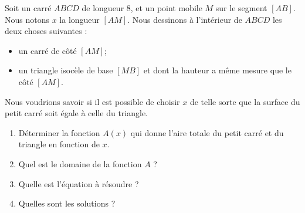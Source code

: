 
\begin{exercice}\label{exosmath-0078}
 
    Soit un carré \( ABCD\) de longueur \unit{8}{\centi\meter}, et un point mobile \( M\) sur le segment \( [AB]\). Nous notons \( x\) la longueur \( [AM]\). Nous dessinons à l'intérieur de \( ABCD\) les deux choses suivantes :
    \begin{itemize}
        \item un carré de côté \( [AM]\);
        \item
            un triangle isocèle de base \( [MB]\) et dont la hauteur a même mesure que le côté \( [AM]\).
    \end{itemize}
    Nous voudrions savoir si il est possible de choisir \( x\) de telle sorte que la surface du petit carré soit égale à celle du triangle.
    \begin{enumerate}
        \item
            Déterminer la fonction \( A(x)\) qui donne l'aire totale du petit carré et du triangle en fonction de \( x\).
        \item
            Quel est le domaine de la fonction \( A\) ?
        \item
            Quelle est l'équation à résoudre ?
        \item
            Quelles sont les solutions ?
    \end{enumerate}

\end{exercice}
